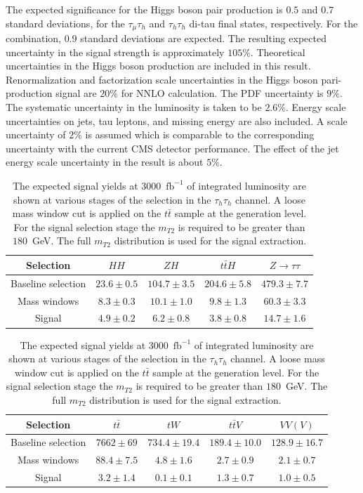 The expected significance for the Higgs boson pair production is $0.5$ and $0.7$ standard deviations, for the $\tau_{\mu}\tau_{h}$ and $\tau_{h}\tau_{h}$ di-tau final states, respectively. For the combination, $0.9$ standard deviations are expected. The resulting expected uncertainty in the signal strength is approximately $105\%$. Theoretical uncertainties in the Higgs boson production are
included in this result. Renormalization and factorization scale
uncertainties in the Higgs boson pari-production signal are $20\%$ for NNLO
calculation. The PDF uncertainty is $9\%$. The systematic uncertainty in
the luminosity is taken to be $2.6\%$. Energy scale uncertainties on jets, tau leptons, and missing energy are also included. A scale uncertainty of $2\%$ is assumed which is comparable to the corresponding uncertainty with the current CMS detector performance. The effect of the jet energy scale uncertainty in the result is about $5\%$.       

\begin{table}[!ht]
\begin{center} 
\begin{tabular}{|c|c|c|c|c|}
\hline
Selection  & $HH$ & $ZH$ & $t\bar{t}H$ & $Z\rightarrow \tau\tau$  \\  \hline
Baseline selection & $23.6\pm0.5$ & $104.7\pm3.5$ & $204.6\pm5.8$ & $479.3\pm7.7$  \\
Mass windows  & $8.3\pm0.3$ & $10.1\pm1.0$ & $9.8\pm1.3$ & $60.3\pm3.3$ \\ 
Signal  & $4.9\pm0.2$ & $6.2\pm0.8$ &  $3.8\pm0.8$ & $14.7\pm1.6$ \\ \hline
\end{tabular}

\vspace{2mm}

\begin{tabular}{|c|c|c|c|c|}
\hline
Selection   & $t\bar{t}$ & $tW$ & $t\bar{t}V$ & $VV(V)$  \\  \hline
Baseline selection & $7662\pm69$ & $734.4\pm19.4$ & $189.4\pm10.0$ & $128.9\pm16.7$  \\
Mass windows  & $88.4\pm7.5$ & $4.8\pm1.6$ & $2.7\pm0.9$ & $2.1\pm0.7$ \\ 
Signal  & $3.2\pm1.4$ & $0.1\pm0.1$ & $1.3\pm0.7$ & $1.0\pm0.5$ \\ \hline
\end{tabular}

\caption{ The expected signal yields at $3000$~$\mathrm{fb}^{-1}$ of integrated luminosity are shown at various stages of the  selection in the $\tau_{h}\tau_{h}$ channel. A loose mass window cut is applied on the $t\bar{t}$ sample at the  generation level. For the signal selection stage the $m_{T2}$ is required to be greater than $180$~GeV. The full $m_{T2}$ distribution is used for the signal extraction.}
\label{tab:hhsig}
\end{center}
\end{table}


